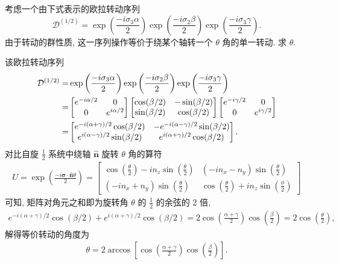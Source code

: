 \documentclass{assignment}
\begin{document}
\begin{prob}[课本习题 3.9]
    考虑一个由下式表示的欧拉转动序列
    \[
        \mathcal{D}^{(1/2)}=\exp\left(\frac{-i\sigma_3\alpha}{2}\right)\exp\left(\frac{-i\sigma_2\beta}{2}\right)\exp\left(\frac{-i\sigma_3\gamma}{2}\right).
    \]
    由于转动的群性质, 这一序列操作等价于绕某个轴转一个 $\theta$ 角的单一转动. 求 $\theta$.
\end{prob}
\begin{sol}
    该欧拉转动序列
    \begin{align}
        \notag\mathcal{D}^{(1/2)}=&\exp\left(\frac{-i\sigma_3\alpha}{2}\right)\exp\left(\frac{-i\sigma_2\beta}{2}\right)\exp\left(\frac{-i\sigma_3\gamma}{2}\right)\\
        \notag=&\begin{bmatrix}
            e^{-i\alpha/2}&0\\
            0&e^{i\alpha/2}
        \end{bmatrix}\begin{bmatrix}
            \cos(\beta/2)&-\sin(\beta/2)\\
            \sin(\beta/2)&\cos(\beta/2)
        \end{bmatrix}\begin{bmatrix}
            e^{-i\gamma/2}&0\\
            0&e^{i\gamma/2}
        \end{bmatrix}\\
        =&\begin{bmatrix}
            e^{-i(\alpha+\gamma)/2}\cos(\beta/2)&-e^{-i(\alpha-\gamma)/2}\sin(\beta/2)\\
            e^{i(\alpha-\gamma)/2}\sin(\beta/2)&e^{i(\alpha+\gamma)/2}\cos(\beta/2)
        \end{bmatrix}.
    \end{align}
    对比自旋 $\frac{1}{2}$ 系统中绕轴 $\hat{\bm{n}}$ 旋转 $\theta$ 角的算符
    \begin{align}
        U=\exp\left(\frac{-i\bm{\sigma}\cdot\hat{\bm{n}}\theta}{2}\right)=\begin{bmatrix}
            \cos\left(\frac{\theta}{2}\right)-in_z\sin\left(\frac{\theta}{2}\right)&(-in_x-n_y)\sin\left(\frac{\theta}{2}\right)\\
            (-in_x+n_y)\sin\left(\frac{\theta}{2}\right)&\cos\left(\frac{\theta}{2}\right)+in_z\sin\left(\frac{\phi}{2}\right)
        \end{bmatrix}
    \end{align}
    可知, 矩阵对角元之和即为旋转角 $\theta$ 的 $\frac{1}{2}$ 的余弦的 2 倍,
    \begin{align}
        e^{-i(\alpha+\gamma)/2}\cos(\beta/2)+e^{i(\alpha+\gamma)/2}\cos(\beta/2)=2\cos(\frac{\alpha+\gamma}{2})\cos\left(\frac{\beta}{2}\right)=2\cos\left(\frac{\theta}{2}\right),
    \end{align}
    解得等价转动的角度为
    \begin{align}
        \theta=2\arccos\left[\cos\left(\frac{\alpha+\gamma}{2}\right)\cos\left(\frac{\beta}{2}\right)\right].
    \end{align}
\end{sol}
\end{document}
